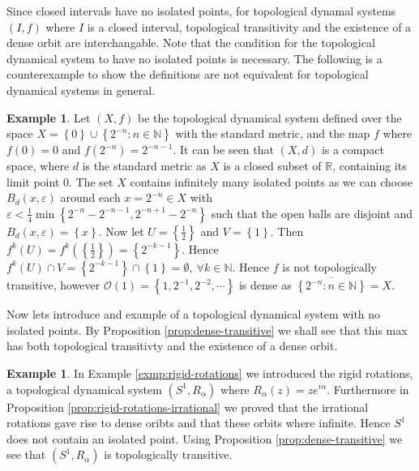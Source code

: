 \documentclass[11pt,a4paper,oneside]{memoir}
\theoremstyle{plain}
\theoremstyle{definition}
\newtheorem{exmp}[thm]{Example}
\begin{document}
Since closed intervals have no isolated points, for topological dynamal systems $(I, f)$ where $I$ is a closed interval, topological transitivity and the existence of a dense orbit are interchangable. Note that the condition for the topological dynamical system to have no isolated points is necessary. The following is a counterexample to show the definitions are not equivalent for topological dynamical systems in general.

\begin{exmp} \label{exmp:dense-orbit-not-equal-transitive}
    Let $(X, f)$ be the topological dynamical system defined over the space $X = \left\lbrace 0 \right\rbrace \cup \left\lbrace 2^{-n} : n \in \mathbb{N} \right\rbrace$ with the standard metric, and the map $f$ where $f(0) = 0$ and $f(2^{-n}) = 2^{-n-1}$. It can be seen that $(X, d)$ is a compact space, where $d$ is the standard metric as $X$ is a closed subset of $\mathbb{R}$, containing its limit point $0$. The set $X$ contains infinitely many isolated points as we can choose $B_d(x, \varepsilon)$ around each $x = 2^{-n} \in X$ with $\varepsilon < \frac{1}{4} \min\left\lbrace 2^{-n} - 2^{-n-1}, 2^{-n + 1} - 2^{-n} \right\rbrace$ such that the open balls are disjoint and $B_d(x, \varepsilon) = \left\lbrace x \right\rbrace$. Now let $U = \left\lbrace \frac{1}{2} \right\rbrace$ and $V = \left\lbrace 1 \right\rbrace$. Then $f^k(U) = f^k(\left\lbrace \frac{1}{2} \right\rbrace) = \left\lbrace 2^{-k-1} \right\rbrace$. Hence $f^k(U) \cap V = \left\lbrace 2^{-k-1} \right\rbrace \cap \left\lbrace 1 \right\rbrace = \emptyset, \ \forall k \in \mathbb{N}$. Hence $f$ is not topologically transitive, however $\mathcal{O}(1) = \left\lbrace 1, 2^{-1}, 2^{-2}, \cdots \right\rbrace$ is dense as $\overline{\left\lbrace2^{-n}: n \in \mathbb{N}\right\rbrace} = X$.
\end{exmp}

Now lets introduce and example of a topological dynamical system with no isolated points. By Proposition \ref{prop:dense-transitive} we shall see that this max has both topological transitivty and the existence of a dense orbit.

\begin{exmp} \label{exmp:dense-orbit-and-transitive}
    In Example \ref{exmp:rigid-rotations} we introduced the rigid rotations, a topological dynamical system $(S^1, R_\alpha)$ where $R_{\alpha}(z) = ze^{i\alpha}$. Furthermore in Proposition \ref{prop:rigid-rotations-irrational} we proved that the irrational rotations gave rise to dense oribts and that these orbits where infinite. Hence $S^1$ does not contain an isolated point. Using Proposition \ref{prop:dense-transitive} we see that $(S^1, R_\alpha)$ is topologically transitive.
\end{exmp}
\end{document}
